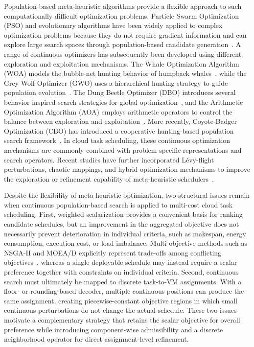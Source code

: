 \documentclass[pdflatex,onecolumn,sn-mathphys-num]{sn-jnl}
\begin{document}
Population-based meta-heuristic algorithms provide a flexible approach to such computationally difficult optimization problems. Particle Swarm Optimization (PSO) and evolutionary algorithms have been widely applied to complex optimization problems because they do not require gradient information and can explore large search spaces through population-based candidate generation~\cite{Kennedy1995,Goldberg1989,Yang2014}. A range of continuous optimizers has subsequently been developed using different exploration and exploitation mechanisms. The Whale Optimization Algorithm (WOA) models the bubble-net hunting behavior of humpback whales~\cite{Mirjalili2016}, while the Grey Wolf Optimizer (GWO) uses a hierarchical hunting strategy to guide population evolution~\cite{Mirjalili2014}. The Dung Beetle Optimizer (DBO) introduces several behavior-inspired search strategies for global optimization~\cite{Xue2022}, and the Arithmetic Optimization Algorithm (AOA) employs arithmetic operators to control the balance between exploration and exploitation~\cite{Abualigah2021}. More recently, Coyote-Badger Optimization (CBO) has introduced a cooperative hunting-based population search framework~\cite{Khatab2025}. In cloud task scheduling, these continuous optimization mechanisms are commonly combined with problem-specific representations and search operators. Recent studies have further incorporated L\'{e}vy-flight perturbations, chaotic mappings, and hybrid optimization mechanisms to improve the exploration or refinement capability of meta-heuristic schedulers~\cite{Chintale2024,Sabipour2025,Zhu2025}.

Despite the flexibility of meta-heuristic optimization, two structural issues remain when continuous population-based search is applied to multi-cost cloud task scheduling. First, weighted scalarization provides a convenient basis for ranking candidate schedules, but an improvement in the aggregated objective does not necessarily prevent deterioration in individual criteria, such as makespan, energy consumption, execution cost, or load imbalance. Multi-objective methods such as NSGA-II and MOEA/D explicitly represent trade-offs among conflicting objectives~\cite{Deb2002,Zhang2007}, whereas a single deployable schedule may instead require a scalar preference together with constraints on individual criteria. Second, continuous search must ultimately be mapped to discrete task-to-VM assignments. With a floor- or rounding-based decoder, multiple continuous positions can produce the same assignment, creating piecewise-constant objective regions in which small continuous perturbations do not change the actual schedule. These two issues motivate a complementary strategy that retains the scalar objective for overall preference while introducing component-wise admissibility and a discrete neighborhood operator for direct assignment-level refinement.
\end{document}
